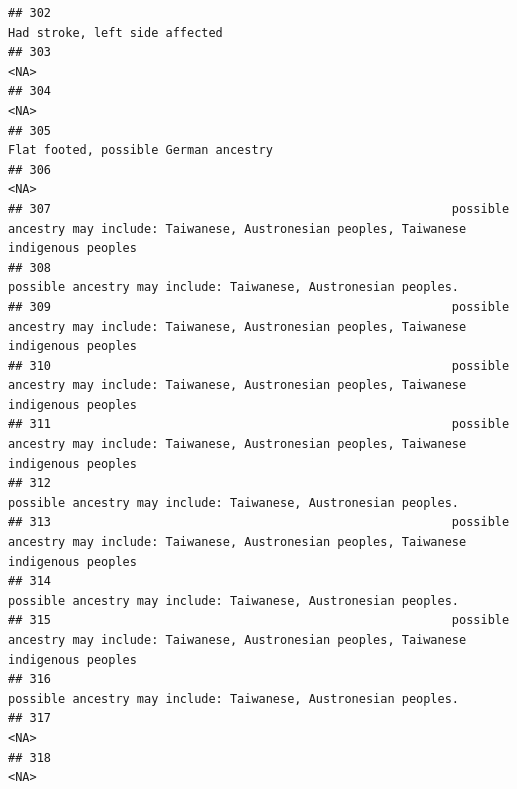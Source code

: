 \documentclass[]{article}
\begin{document}
\begin{verbatim}
## 302                                                                                                                      Had stroke, left side affected
## 303                                                                                                                                                <NA>
## 304                                                                                                                                                <NA>
## 305                                                                                                               Flat footed, possible German ancestry
## 306                                                                                                                                                <NA>
## 307                                                        possible ancestry may include: Taiwanese, Austronesian peoples, Taiwanese indigenous peoples
## 308                                                                                     possible ancestry may include: Taiwanese, Austronesian peoples.
## 309                                                        possible ancestry may include: Taiwanese, Austronesian peoples, Taiwanese indigenous peoples
## 310                                                        possible ancestry may include: Taiwanese, Austronesian peoples, Taiwanese indigenous peoples
## 311                                                        possible ancestry may include: Taiwanese, Austronesian peoples, Taiwanese indigenous peoples
## 312                                                                                     possible ancestry may include: Taiwanese, Austronesian peoples.
## 313                                                        possible ancestry may include: Taiwanese, Austronesian peoples, Taiwanese indigenous peoples
## 314                                                                                     possible ancestry may include: Taiwanese, Austronesian peoples.
## 315                                                        possible ancestry may include: Taiwanese, Austronesian peoples, Taiwanese indigenous peoples
## 316                                                                                     possible ancestry may include: Taiwanese, Austronesian peoples.
## 317                                                                                                                                                <NA>
## 318                                                                                                                                                <NA>

\end{verbatim}
\end{document}
